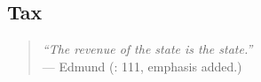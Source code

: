 \documentclass[11pt,a4paper,oneside,openright]{article}
\begin{document}
\subsection{Tax}

\begin{quote}
	\emph{``The revenue of the state \emph{is} the state.''}\\
	--- Edmund \citeauthor{Burke1790} (\citeyear{Burke1790}: 111, emphasis added.)
\end{quote}



\end{document}
